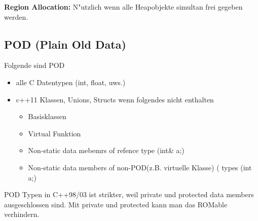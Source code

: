 

\textbf{Region Allocation:} N"utzlich wenn alle Heapobjekte simultan frei gegeben werden. 
\subsection{POD (Plain Old Data)}
Folgende sind POD
\begin{itemize}
 \item alle C Datentypen (int, float, uws.)
 \item c++11 Klassen, Unions, Structs wenn folgendes nicht enthalten 
 \begin{itemize}
     \item Basisklassen
     \item Virtual Funktion
     \item Non-static data mebemrs of refence type (int\& a;)
     \item Non-static data members of non-POD(z.B. virtuelle Klasse) ( types (int a;)
 \end{itemize}
\end{itemize}
POD Typen in C++98/03 ist strikter, weil private und protected data members ausgeschlossen sind. Mit private und protected kann man das ROMable verhindern.

